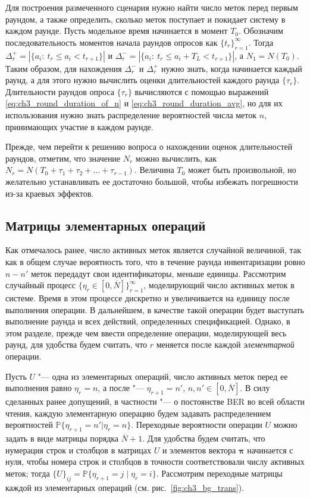 Для построения размеченного сценария нужно найти число меток перед первым раундом, а также определить, сколько меток поступает и покидает систему в каждом раунде. Пусть модельное время начинается в момент $T_0$. Обозначим последовательность моментов начала раундов опросов как $\{ t_r \}_{r=1}^\infty$. Тогда $\Delta_r^+ = |\{ a_i :\: t_r \leqslant a_i < t_{r+1} \}|$ и $\Delta_r^- = |\{ a_i:\: t_r \leqslant a_i + T_L < t_{r+1} \}|$, а $N_1 = N(T_0)$. Таким образом, для нахождения $\Delta_r^-$ и $\Delta_r^+$ нужно знать, когда начинается каждый раунд, а для этого нужно вычислить оценки длительностей каждого раунда $\{ \tau_r \}$. Длительности раундов опроса $\{ \tau_r \}$ вычисляются с помощью выражений \eqref{eq:ch3_round_duration_of_n} и \eqref{eq:ch3_round_duration_avg}, но для их использования нужно знать распределение вероятностей числа меток $n$, принимающих участие в каждом раунде.

Прежде, чем перейти к решению вопроса о нахождении оценок длительностей раундов, отметим, что значение $N_r$ можно вычислить, как $N_r = N(T_0 + \tau_1 + \tau_2 + \dots + \tau_{r-1}).$ Величина $T_0$ может быть произвольной, но желательно устанавливать ее достаточно большой, чтобы избежать погрешности из-за краевых эффектов.


\subsection{Матрицы элементарных операций}\label{subsec:ch3_bg_elem_op_matrices}
Как отмечалось ранее, число активных меток является случайной величиной, так как в общем случае вероятность того, что в течение раунда инвентаризации ровно $n - n'$ меток передадут свои идентификаторы, меньше единицы. Рассмотрим случайный процесс $\{ \eta_r \in [0, \overline{N}] \}_{r=1}^\infty$, моделирующий число активных меток в системе. Время в этом процессе дискретно и увеличивается на единицу после выполнения операции. В дальнейшем, в качестве такой операции будет выступать выполнение раунда и всех действий, определенных спецификацией. Однако, в этом разделе, прежде чем ввести определение операции, моделирующей весь раунд, для удобства будем считать, что $r$ меняется после каждой \textit{элементарной} операции.

Пусть $U$ "--- одна из элементарных операций, число активных меток перед ее выполнения равно $\eta_r = n$, а после "--- $\eta_{r+1} = n'$, $n,n' \in [0,\overline{N}]$. В силу сделанных ранее допущений, в частности "--- о постоянстве BER во всей области чтения, каждую элементарную операцию будем задавать распределением вероятностей $\mathbb{P}\{\eta_{r+1} = n' | \eta_r = n\}$. Переходные вероятности операции $U$ можно задать в виде матрицы порядка $\overline{N} + 1$. Для удобства будем считать, что нумерация строк и столбцов в матрицах $U$ и элементов вектора $\bm{\pi}$ начинается с нуля, чтобы номера строк и столбцов в точности соответствовали числу активных меток; тогда $\{ U \}_{ij} = \mathbb{P}\{ \eta_{r+1} = j\; |\; \eta_{r} = i \}$. Рассмотрим переходные матрицы каждой из элементарных операций (см. рис.~\ref{fig:ch3_bg_trans}).

